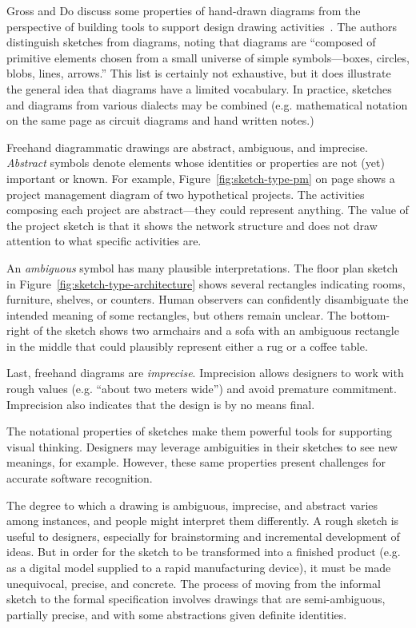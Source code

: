 

Gross and Do discuss some properties of hand-drawn diagrams from the
perspective of building tools to support design drawing
activities~\cite{gross-ecn-uist}. The authors distinguish sketches
from diagrams, noting that diagrams are ``composed of primitive
elements chosen from a small universe of simple symbols---boxes,
circles, blobs, lines, arrows.'' This list is certainly not
exhaustive, but it does illustrate the general idea that diagrams have
a limited vocabulary. In practice, sketches and diagrams from various
dialects may be combined (e.g. mathematical notation on the same page
as circuit diagrams and hand written notes.)

Freehand diagrammatic drawings are abstract, ambiguous, and
imprecise. \textit{Abstract} symbols denote elements whose identities
or properties are not (yet) important or known. For example,
Figure~\ref{fig:sketch-type-pm} on page \pageref{fig:sketch-type-pm}
shows a project management diagram of two hypothetical projects. The
activities composing each project are abstract---they could represent
anything. The value of the project sketch is that it shows the network
structure and does not draw attention to what specific activities are.

An \textit{ambiguous} symbol has many plausible interpretations. The
floor plan sketch in Figure~\ref{fig:sketch-type-architecture} shows
several rectangles indicating rooms, furniture, shelves, or
counters. Human observers can confidently disambiguate the intended
meaning of some rectangles, but others remain unclear. The
bottom-right of the sketch shows two armchairs and a sofa with an
ambiguous rectangle in the middle that could plausibly represent
either a rug or a coffee table.

Last, freehand diagrams are \textit{imprecise}. Imprecision allows
designers to work with rough values (e.g. ``about two meters wide'')
and avoid premature commitment. Imprecision also indicates that the
design is by no means final.

The notational properties of sketches make them powerful tools for
supporting visual thinking. Designers may leverage ambiguities in
their sketches to see new meanings, for example. However, these same
properties present challenges for accurate software recognition.

The degree to which a drawing is ambiguous, imprecise, and abstract
varies among instances, and people might interpret them differently. A
rough sketch is useful to designers, especially for brainstorming and
incremental development of ideas. But in order for the sketch to be
transformed into a finished product (e.g. as a digital model supplied
to a rapid manufacturing device), it must be made unequivocal,
precise, and concrete. The process of moving from the informal sketch
to the formal specification involves drawings that are semi-ambiguous,
partially precise, and with some abstractions given definite
identities.

